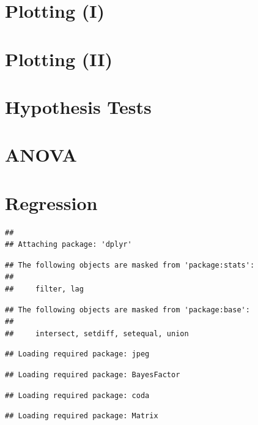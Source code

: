 \documentclass[]{book}
\theoremstyle{definition}
\theoremstyle{definition}
\theoremstyle{remark}
\begin{document}
\chapter{Plotting (I)}\label{plotting1}

\chapter{Plotting (II)}\label{plotting2}

\chapter{Hypothesis Tests}\label{htests}

\chapter{ANOVA}\label{anova}

\chapter{Regression}\label{regression}

\begin{verbatim}
## 
## Attaching package: 'dplyr'
\end{verbatim}

\begin{verbatim}
## The following objects are masked from 'package:stats':
## 
##     filter, lag
\end{verbatim}

\begin{verbatim}
## The following objects are masked from 'package:base':
## 
##     intersect, setdiff, setequal, union
\end{verbatim}

\begin{verbatim}
## Loading required package: jpeg
\end{verbatim}

\begin{verbatim}
## Loading required package: BayesFactor
\end{verbatim}

\begin{verbatim}
## Loading required package: coda
\end{verbatim}

\begin{verbatim}
## Loading required package: Matrix
\end{verbatim}
\end{document}
